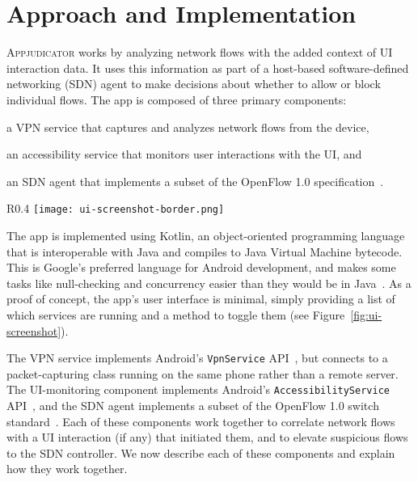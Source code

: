 \section{Approach and Implementation}
\label{sec:implementation}

\textsc{Appjudicator} works by analyzing network flows with the added context of
UI interaction data. It uses this information as part of a host-based
software-defined networking (SDN) agent to make decisions about whether to allow
or block individual flows. The app is composed of three primary components:
\begin{enumerate*}[label=(\arabic*)]
	\item a VPN service that captures and analyzes network flows from the
		device,
	\item an accessibility service that monitors user interactions with the
		UI, and
	\item an SDN agent that implements a subset of the OpenFlow 1.0
		specification~\cite{openflowspec}.
\end{enumerate*}

\begin{wrapfigure}{R}{0.4\textwidth}
	\centering
	\texttt{[image: ui-screenshot-border.png]}
	\caption{A screenshot of \textsc{Appjudicator}'s user interface (vertical
		whitespace truncated for brevity).}
	\label{fig:ui-screenshot}
\end{wrapfigure}


The app is implemented using Kotlin, an object-oriented programming language
that is interoperable with Java and compiles to Java Virtual Machine bytecode.
This is Google's preferred language for Android development, and makes some
tasks like null-checking and concurrency easier than they would be in
Java~\cite{lardinois2019}. As a proof of concept, the app's user interface is
minimal, simply providing a list of which services are running and a method to
toggle them (see Figure~\ref{fig:ui-screenshot}).

The VPN service implements Android's \texttt{VpnService}
API~\cite{googledevelopers2020vpn}, but connects to a packet-capturing class
running on the same phone rather than a remote server. The UI-monitoring
component implements Android's \texttt{AccessibilityService}
API~\cite{googledevelopers2020}, and the SDN agent implements a subset of the
OpenFlow 1.0 switch standard~\cite{mckeown2008}. Each of these components work
together to correlate network flows with a UI interaction (if any) that
initiated them, and to elevate suspicious flows to the SDN controller. We now
describe each of these components and explain how they work together.


